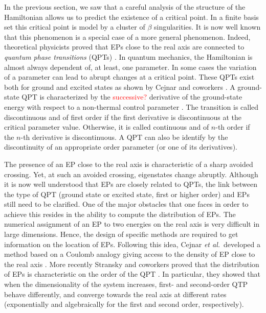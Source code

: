 \documentclass[11pt,a4paper]{article}
\newcommand{\titou}[1]{\textcolor{red}{#1}}
\begin{document}
In the previous section, we saw that a careful analysis of the structure of the Hamiltonian allows us to predict the existence of a critical point. In a finite basis set this critical point is model by a cluster of $\beta$ singularities. It is now well known that this phenomenon is a special case of a more general phenomenon. Indeed, theoretical physicists proved that EPs close to the real axis are connected to \textit{quantum phase transitions} (QPTs) \cite{Heiss_1988, Heiss_2002, Cejnar_2005, Cejnar_2007, Cejnar_2009, Borisov_2015, Sindelka_2017}. In quantum mechanics, the Hamiltonian is almost always dependent of, at least, one parameter. In some cases the variation of a parameter can lead to abrupt changes at a critical point. These QPTs exist both for ground and excited states as shown by Cejnar and coworkers \cite{Cejnar_2009, Sachdev_2011, Cejnar_2015, Cejnar_2016, Caprio_2008, Macek_2019}. A ground-state QPT is characterized by the \titou{successive?} derivative of the ground-state energy with respect to a non-thermal control parameter \cite{Cejnar_2009, Sachdev_2011}. The transition is called discontinuous and of first order if the first derivative is discontinuous at the critical parameter value. Otherwise, it is called continuous and of $n$-th order if the $n$-th derivative is discontinuous. A QPT can also be identify by the discontinuity of an appropriate order parameter (or one of its derivatives). 

The presence of an EP close to the real axis is characteristic of a sharp avoided crossing. Yet, at such an avoided crossing, eigenstates change abruptly. Although it is now well understood that EPs are closely related to QPTs, the link between the type of QPT (ground state or excited state, first or higher order) and EPs still need to be clarified. One of the major obstacles that one faces in order to achieve this resides in the ability to compute the distribution of EPs. The numerical assignment of an EP to two energies on the real axis is very difficult in large dimensions. Hence, the design of specific methods are required to get information on the location of EPs. Following this idea, Cejnar \textit{et al.}~developed a method based on a Coulomb analogy giving access to the density of EP close to the real axis \cite{Cejnar_2005, Cejnar_2007}. More recently Stransky and coworkers proved that the distribution of EPs is characteristic on the order of the QPT \cite{Stransky_2018}. In particular, they showed that when the dimensionality of the system increases, first- and second-order QTP behave differently, and converge towards the real axis at different rates (exponentially and algebraically for the first and second order, respectively).
\end{document}

